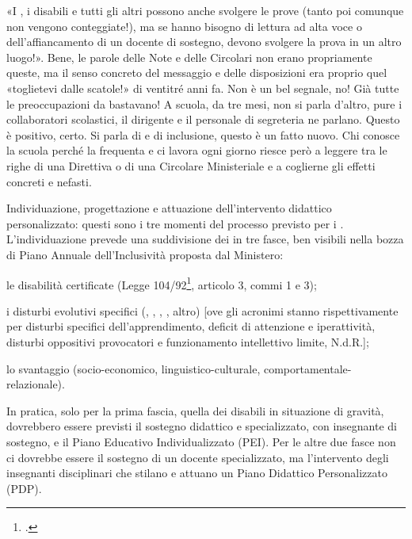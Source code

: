 «I , i disabili e tutti gli altri   possono anche svolgere le prove (tanto poi comunque non vengono conteggiate!), ma se hanno bisogno di lettura ad alta voce o dell'affiancamento di un docente di sostegno, devono svolgere la prova in un altro luogo!». Bene, le parole delle Note e delle Circolari  non erano propriamente queste, ma il senso concreto del messaggio e delle disposizioni era proprio quel «toglietevi dalle scatole!» di ventitré anni fa. Non è un bel segnale, no!
Già tutte le preoccupazioni da  bastavano! A scuola, da tre mesi, non si parla d'altro, pure i collaboratori scolastici, il dirigente e il personale di segreteria ne parlano. Questo è positivo, certo. Si parla di  e di inclusione, questo è un fatto nuovo. Chi conosce la scuola perché la frequenta e ci lavora ogni giorno riesce però a leggere tra le righe di una Direttiva o di una Circolare Ministeriale e a coglierne gli effetti concreti e nefasti.

Individuazione, progettazione e attuazione dell'intervento didattico personalizzato: questi sono i tre momenti del processo previsto per i . L'individuazione prevede una suddivisione dei  in tre fasce, ben visibili nella bozza di Piano Annuale dell'Inclusività proposta dal Ministero:
\begin{description}
	\item[$-$] le disabilità certificate (Legge 104/92\footcite{Legge_104_92}, articolo 3, commi 1 e 3);
	\item i disturbi evolutivi specifici (, , , , altro) [ove gli acronimi stanno rispettivamente per disturbi specifici dell'apprendimento, deficit di attenzione e iperattività, disturbi oppositivi provocatori e funzionamento intellettivo limite, N.d.R.];
	\item lo svantaggio (socio-economico, linguistico-culturale, comportamentale-relazionale).
\end{description}

In pratica, solo per la prima fascia, quella dei disabili in situazione di gravità, dovrebbero essere previsti il sostegno didattico e specializzato, con insegnante di sostegno, e il Piano Educativo Individualizzato (PEI). Per le altre due fasce non ci dovrebbe essere il sostegno di un docente specializzato, ma l'intervento degli insegnanti disciplinari che stilano e attuano un Piano Didattico Personalizzato (PDP).

